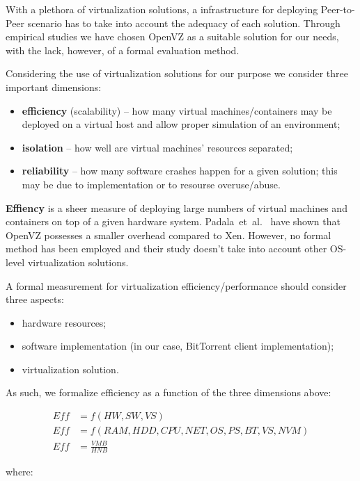 With a plethora of virtualization solutions, a infrastructure for deploying
Peer-to-Peer scenario has to take into account the adequacy of each solution.
Through empirical studies we have chosen OpenVZ as a suitable solution for our
needs, with the lack, however, of a formal evaluation method.

Considering the use of virtualization solutions for our purpose we consider
three important dimensions:

\begin{itemize}
  \item \textbf{efficiency} (scalability) -- how many virtual
  machines/containers may be deployed on a virtual host and allow proper
  simulation of an environment;
  \item \textbf{isolation} -- how well are virtual machines' resources
  separated;
  \item \textbf{reliability} -- how many software crashes happen for a given
  solution; this may be due to implementation or to resourse overuse/abuse.
\end{itemize}

\textbf{Effiency} is a sheer measure of deploying large numbers of virtual
machines and containers on top of a given hardware system.
Padala~et~al.~\cite{eval-virt-performance} have shown that OpenVZ possesses a
smaller overhead compared to Xen. However, no formal method has been employed
and their study doesn't take into account other OS-level virtualization
solutions.

A formal measurement for virtualization efficiency/performance should consider
three aspects:

\begin{itemize}
  \item hardware resources;
  \item software implementation (in our case, BitTorrent client
  implementation);
  \item virtualization solution.
\end{itemize}

As such, we formalize efficiency as a function of the three dimensions above:

\begin{align}
Eff & = f(HW, SW, VS)\\
Eff & = f(RAM, HDD, CPU, NET, OS, PS, BT, VS, NVM)\\
Eff &= \frac{VMB}{HNB}
\end{align}

where:

